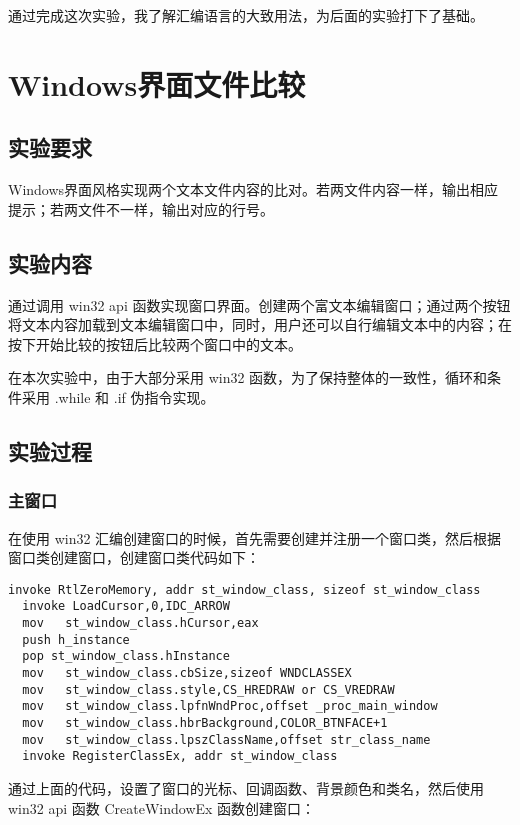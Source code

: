 \documentclass[proposal-report]{bitart}
\begin{document}
通过完成这次实验，我了解汇编语言的大致用法，为后面的实验打下了基础。

\section{Windows界面文件比较}

\subsection{实验要求}

Windows界面风格实现两个文本文件内容的比对。若两文件内容一样，输出相应提示；若两文件不一样，输出对应的行号。

\subsection{实验内容}

通过调用 win32 api 函数实现窗口界面。创建两个富文本编辑窗口；通过两个按钮将文本内容加载到文本编辑窗口中，同时，用户还可以自行编辑文本中的内容；在按下开始比较的按钮后比较两个窗口中的文本。

在本次实验中，由于大部分采用 win32 函数，为了保持整体的一致性，循环和条件采用 .while 和 .if 伪指令实现。

\subsection{实验过程}

\subsubsection{主窗口}

在使用 win32 汇编创建窗口的时候，首先需要创建并注册一个窗口类，然后根据窗口类创建窗口，创建窗口类代码如下：

\begin{lstlisting}[language={[x86masm]Assembler}]
  invoke RtlZeroMemory, addr st_window_class, sizeof st_window_class
  invoke LoadCursor,0,IDC_ARROW
  mov	st_window_class.hCursor,eax
  push h_instance
  pop st_window_class.hInstance
  mov	st_window_class.cbSize,sizeof WNDCLASSEX
  mov	st_window_class.style,CS_HREDRAW or CS_VREDRAW
  mov	st_window_class.lpfnWndProc,offset _proc_main_window
  mov	st_window_class.hbrBackground,COLOR_BTNFACE+1
  mov	st_window_class.lpszClassName,offset str_class_name
  invoke RegisterClassEx, addr st_window_class
\end{lstlisting}

通过上面的代码，设置了窗口的光标、回调函数、背景颜色和类名，然后使用 win32 api 函数 CreateWindowEx 函数创建窗口：
\end{document}
